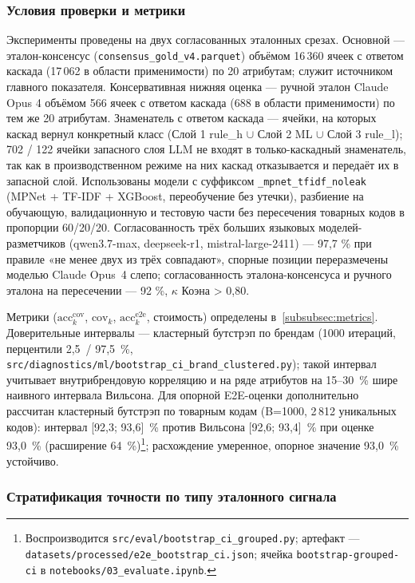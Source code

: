 \subsubsection{Условия проверки и метрики}

Эксперименты проведены на двух согласованных эталонных срезах. Основной --- эталон-консенсус (\texttt{consensus\_gold\_v4.parquet}) объёмом 16\,360 ячеек с ответом каскада (17\,062 в области применимости) по 20 атрибутам; служит источником главного показателя. Консервативная нижняя оценка --- ручной эталон Claude Opus 4 объёмом 566 ячеек с ответом каскада (688 в области применимости) по тем же 20 атрибутам. Знаменатель с ответом каскада --- ячейки, на которых каскад вернул конкретный класс (Слой 1 rule\_h $\cup$ Слой 2 ML $\cup$ Слой 3 rule\_l); 702 / 122 ячейки запасного слоя LLM не входят в только-каскадный знаменатель, так как в производственном режиме на них каскад отказывается и передаёт их в запасной слой. Использованы модели с суффиксом \texttt{\_mpnet\_tfidf\_noleak} (MPNet + TF-IDF + XGBoost, переобучение без утечки), разбиение на обучающую, валидационную и тестовую части без пересечения товарных кодов в пропорции 60/20/20. Согласованность трёх больших языковых моделей-разметчиков (qwen3.7-max, deepseek-r1, mistral-large-2411) --- 97,7 \% при правиле «не менее двух из трёх совпадают», спорные позиции переразмечены моделью Claude Opus~4 слепо; согласованность эталона-консенсуса и ручного эталона на пересечении --- 92 \%, $\kappa$ Коэна > 0,80.

Метрики ($\text{acc}^{\text{cov}}_k$, $\text{cov}_k$, $\text{acc}^{\text{e2e}}_k$, стоимость) определены в~\ref{subsubsec:metrics}. Доверительные интервалы --- кластерный бутстрэп по брендам (1000 итераций, перцентили 2,5~/ 97,5~\%, \texttt{src/diagnostics/ml/bootstrap\_ci\_brand\_clustered.py}); такой интервал учитывает внутрибрендовую корреляцию и на ряде атрибутов на 15--30~\% шире наивного интервала Вильсона. Для опорной E2E-оценки дополнительно рассчитан кластерный бутстрэп по товарным кодам (B=1000, 2\,812 уникальных кодов): интервал [92,3; 93,6]~\% против Вильсона [92,6; 93,4]~\% при оценке 93,0~\% (расширение 64~\%)\footnote{Воспроизводится \texttt{src/eval/bootstrap\_ci\_grouped.py}; артефакт --- \texttt{datasets/processed/e2e\_bootstrap\_ci.json}; ячейка \texttt{bootstrap-grouped-ci} в \texttt{notebooks/03\_evaluate.ipynb}.}; расхождение умеренное, опорное значение 93,0~\% устойчиво.

\subsubsection{Стратификация точности по типу эталонного сигнала}
\label{subsec:tier_stratification}

